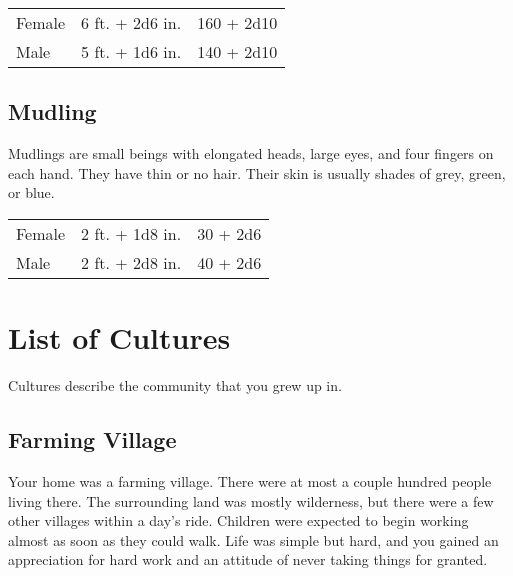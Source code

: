 \begin{multicols}{2}
\begin{center}
{
\begin{xtabular}{|l|l|l|}
Female & 6 ft. + 2d6 in. & 160 + 2d10 \\
Male & 5 ft. + 1d6 in. & 140 + 2d10 \\
\hline
\end{xtabular}
}
\end{center}

\subsection{Mudling}

Mudlings are small beings with elongated heads, large eyes, and four fingers on each hand. They
have thin or no hair. Their skin is usually shades of grey, green, or blue.

\begin{center}
{
\begin{xtabular}{|l|l|l|}
Female & 2 ft. + 1d8 in. & 30 + 2d6 \\
Male & 2 ft. + 2d8 in. & 40 + 2d6 \\
\hline
\end{xtabular}
}
\end{center}

\section{List of Cultures}

Cultures describe the community that you grew up in. 

\subsection{Farming Village}

Your home was a farming village. There were at most a couple hundred
people living there. The surrounding land was mostly wilderness, but
there were a few other villages within a day's ride. Children were
expected to begin working almost as soon as they could walk. Life was
simple but hard, and you gained an appreciation for hard work and
an attitude of never taking things for granted.


\end{multicols}
